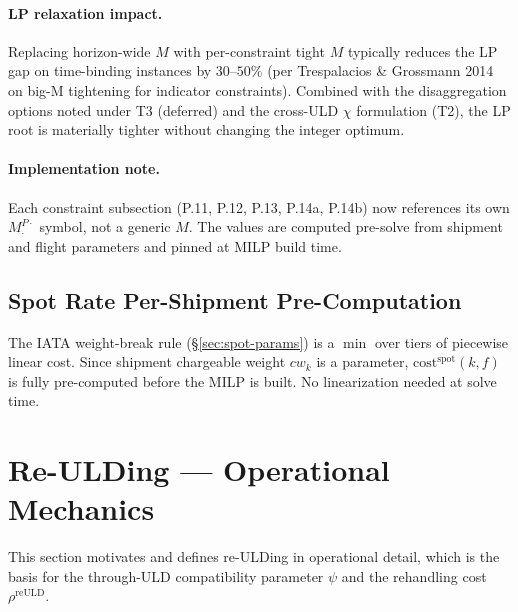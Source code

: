 \documentclass[11pt,a4paper]{article}
\theoremstyle{definition}
\begin{document}
\paragraph{LP relaxation impact.}
Replacing horizon-wide $M$ with per-constraint tight $M$ typically reduces the LP
gap on time-binding instances by $30\text{--}50\%$ (per Trespalacios \& Grossmann
2014 on big-M tightening for indicator constraints). Combined with the disaggregation
options noted under T3 (deferred) and the cross-ULD $\chi$ formulation (T2), the
LP root is materially tighter without changing the integer optimum.

\paragraph{Implementation note.}
Each constraint subsection (P.11, P.12, P.13, P.14a, P.14b) now references its own
$M^{P\cdot}_{\cdot}$ symbol, not a generic $M$. The values are computed pre-solve
from shipment and flight parameters and pinned at MILP build time.

\subsection{Spot Rate Per-Shipment Pre-Computation}

The IATA weight-break rule (\S\ref{sec:spot-params}) is a $\min$ over tiers of piecewise
linear cost. Since shipment chargeable weight $cw_k$ is a parameter, $\text{cost}^{\text{spot}}(k, f)$
is fully pre-computed before the MILP is built. No linearization needed at solve time.

\section{Re-ULDing — Operational Mechanics}
\label{sec:reulding}

This section motivates and defines re-ULDing in operational detail, which is the basis for
the through-ULD compatibility parameter $\psi$ and the rehandling cost $\rho^{\text{reULD}}$.
\end{document}
